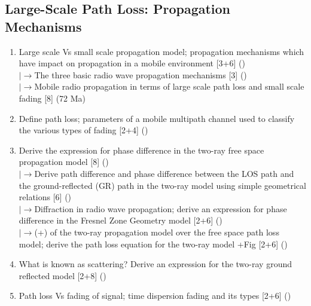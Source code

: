 \documentclass[12pt]{article}
\newcommand{\lb}{\\$\left|\rightarrow\right.$}
\begin{document}
  \subsection{Large-Scale Path Loss: Propagation Mechanisms}
    \begin{enumerate}[topsep=0pt, noitemsep]
      \item Large scale Vs small scale propagation model; propagation mechanisms
        which have impact on propagation in a mobile environment \hfill [3+6] ()
        \lb The three basic radio wave propagation mechanisms \hfill [3] ()
        \lb Mobile radio propagation in terms of large scale path loss and small scale fading \hfill [8] (72 Ma)
      \item Define path loss; parameters of a mobile multipath channel used to classify the
        various types of fading \hfill [2+4] ()
      \item Derive the expression for phase difference in the two-ray free space
        propagation model \hfill [8] ()
        \lb Derive path difference and phase difference between the LOS path and the
        ground-reflected (GR) path in the two-ray model using simple geometrical relations \hfill [6] ()
        \lb Diffraction in radio wave propagation; derive an expression for phase difference
        in the Fresnel Zone Geometry model \hfill [2+6] ()
        \lb (+) of the two-ray propagation model over the free space path loss model;
        derive the path loss equation for the two-ray model +Fig \hfill [2+6] ()
      \item What is known as scattering? Derive an expression for the two-ray ground
        reflected model \hfill [2+8] ()
      \item Path loss Vs fading of signal; time dispersion fading and its types \hfill [2+6] ()
    \end{enumerate}
\end{document}
